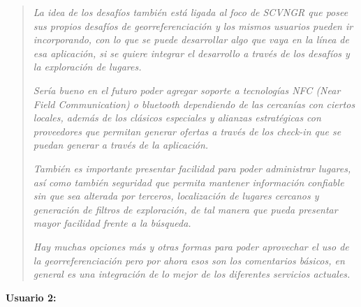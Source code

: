 \documentclass[10pt,letterpaper]{article}
\begin{document}
\begin{quote}
\textit{La idea de los desafíos también está ligada al foco de SCVNGR que posee sus propios desafíos de georreferenciación y los mismos usuarios pueden ir incorporando, con lo que se puede desarrollar algo que vaya en la línea de esa aplicación, si se quiere integrar el desarrollo a través de los desafíos y la exploración de lugares.\\}

\textit{Sería bueno en el futuro poder agregar soporte a tecnologías NFC (Near Field Communication) o bluetooth dependiendo de las cercanías con ciertos locales, además de los clásicos especiales y alianzas estratégicas con proveedores que permitan generar ofertas a través de los check-in que se puedan generar a través de la aplicación.\\}

\textit{También es importante presentar facilidad para poder administrar lugares, así como también seguridad que permita mantener información confiable sin que sea alterada por terceros, localización de lugares cercanos y generación de filtros de exploración, de tal manera que pueda presentar mayor facilidad frente a la búsqueda.\\}

\textit{Hay muchas opciones más y otras formas para poder aprovechar el uso de la georreferenciación pero por ahora esos son los comentarios básicos, en general es una integración de lo mejor de los diferentes servicios actuales.\\}
\end{quote}

\textbf{Usuario 2:}\\
\end{document}
